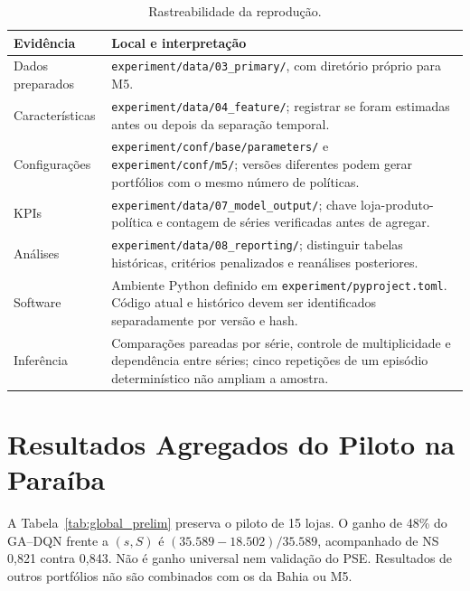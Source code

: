 \begin{table}[htbp]\centering\small
\caption{Rastreabilidade da reprodução.}\label{tab:validation_env}
\begin{tabular}{@{}p{3cm}p{11.4cm}@{}}\toprule
\textbf{Evidência} & \textbf{Local e interpretação}\\\midrule
Dados preparados & \nolinkurl{experiment/data/03_primary/}, com diretório próprio para M5.\\
Características & \nolinkurl{experiment/data/04_feature/}; registrar se foram estimadas antes ou depois da separação temporal.\\
Configurações & \nolinkurl{experiment/conf/base/parameters/} e \nolinkurl{experiment/conf/m5/}; versões diferentes podem gerar portfólios com o mesmo número de políticas.\\
KPIs & \nolinkurl{experiment/data/07_model_output/}; chave loja-produto-política e contagem de séries verificadas antes de agregar.\\
Análises & \nolinkurl{experiment/data/08_reporting/}; distinguir tabelas históricas, critérios penalizados e reanálises posteriores.\\
Software & Ambiente Python definido em \nolinkurl{experiment/pyproject.toml}. Código atual e histórico devem ser identificados separadamente por versão e hash.\\
Inferência & Comparações pareadas por série, controle de multiplicidade e dependência entre séries; cinco repetições de um episódio determinístico não ampliam a amostra.\\
\bottomrule\end{tabular}\end{table}

\section{Resultados Agregados do Piloto na Paraíba}
\label{app:fase1_resultados}
A Tabela~\ref{tab:global_prelim} preserva o piloto de 15 lojas. O ganho de 48\% do GA--DQN frente a $(s,S)$ é $(35.589-18.502)/35.589$, acompanhado de NS 0,821 contra 0,843. Não é ganho universal nem validação do PSE. Resultados de outros portfólios não são combinados com os da Bahia ou M5.


